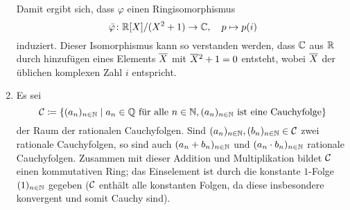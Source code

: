 \begin{example}
\begin{enumerate}
      Damit ergibt sich, dass $\varphi$ einen Ringisomorphismus
      \[
                \bar{\varphi}
        \colon  \mathbb{R}[X]/(X^2 + 1)
        \to     \mathbb{C},
        \quad   p
        \mapsto p(i)
      \]
      induziert.
      Dieser Isomorphismus kann so verstanden werden, dass $\mathbb{C}$ aus $\mathbb{R}$ durch hinzufügen eines Elements $\overline{X}$ mit $\overline{X}{}^2 + 1 = 0$ entsteht, wobei $\overline{X}$ der üblichen komplexen Zahl $i$ entspricht.
      
    \item
      Es sei
      \[
                  \mathcal{C}
        \coloneqq \left\{
                    (a_n)_{n \in \mathbb{N}}
                  \;\middle|\;
                    \text{$a_n \in \mathbb{Q}$ für alle $n \in \mathbb{N}$},
                    \text{$(a_n)_{n \in \mathbb{N}}$ ist eine Cauchyfolge}
                  \right\}
      \]
      der Raum der rationalen Cauchyfolgen.
      Sind $(a_n)_{n \in \mathbb{N}}, (b_n)_{n \in \mathbb{N}} \in \mathcal{C}$ zwei rationale Cauchyfolgen, so sind auch $(a_n + b_n)_{n \in \mathbb{N}}$ und $(a_n \cdot b_n)_{n \in \mathbb{N}}$ rationale Cauchyfolgen.
      Zusammen mit dieser Addition und Multiplikation bildet $\mathcal{C}$ einen kommutativen Ring;
      das Einselement ist durch die konstante $1$-Folge $(1)_{n \in \mathbb{N}}$ gegeben ($\mathcal{C}$ enthält alle konstanten Folgen, da diese insbesondere konvergent und somit Cauchy sind).
      

\end{enumerate}
\end{example}
